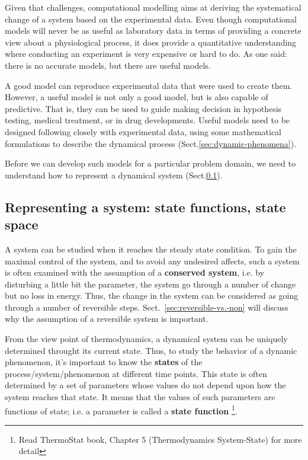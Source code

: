 Given that challenges, computational modelling aims at deriving the systematical
change of a system based on the experimental data.  Even though computational
models will never be as useful as laboratory data in terms of providing a
concrete view about a physiological process, it does provide a quantitative
understanding where conducting an experiment is very expensive or hard to do. As
one said: there is no accurate models, but there are useful models.

A good model can reproduce experimental data that were used to create them.
However, a useful model is not only a good model, but is also capable of
predictive. That is, they can be used to guide making decision in hypothesis
testing, medical treatment, or in drug developments.
Useful models need to be designed following closely with experimental data,
using some mathematical formulations to describe the dynamical process
(Sect.\ref{sec:dynamic-phenomena}).

Before we can develop such models for a particular problem domain, we need to
understand how to represent a dynamical system
(Sect.\ref{sec:representing-system}).

\subsection{Representing a system: state functions, state space}
\label{sec:representing-system}
\label{sec:state-functions}
\label{sec:state-space}

A system can be studied when it reaches the steady state condition. To gain the
maximal control of the system, and to avoid any undesired affects, such a system
is often examined with the assumption of a {\bf conserved system}, i.e. by
disturbing a little bit the parameter, the system go through a number of change
but no loss in energy. Thus, the change in the system can be considered as going
through a number of reversible steps. Sect.~\ref{sec:reversible-vs.-non} will
discuss why the assumption of a reversible system is important.

From the view point of thermodynamics, a dynamical system can be uniquely
determined throught its current state.
Thus, to study the behavior of a dynamic phenomenon, it's important to know the
{\bf states} of the process/system/phenomenon at different time points. This
state is often determined by a set of parameters whose values do not depend upon
how the system reaches that state. It means that the values of such parameters
are functions of state; i.e. a parameter is called a {\bf state function}
\footnote{Read ThermoStat book, Chapter 5 (Thermodynamics System-State) for more
detail}.

